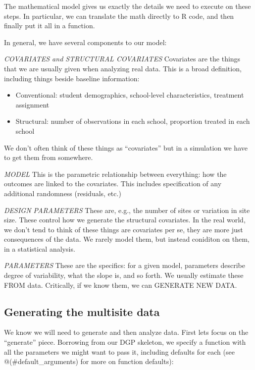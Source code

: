 \documentclass[
]{book}
\providecommand{\tightlist}{%
  \setlength{\itemsep}{0pt}\setlength{\parskip}{0pt}}
\begin{document}
The mathematical model gives us exactly the details we need to execute on these steps.
In particular, we can translate the math directly to R code, and then finally put it all in a function.

In general, we have several components to our model:

\emph{COVARIATES and STRUCTURAL COVARIATES}
Covariates are the things that we are usually given when analyzing real data.
This is a broad definition, including things beside baseline information:

\begin{itemize}
\tightlist
\item
  Conventional: student demographics, school-level characteristics, treatment assignment
\item
  Structural: number of observations in each school, proportion treated in each school
\end{itemize}

We don't often think of these things as ``covariates'' but in a simulation we have to get them from somewhere.

\emph{MODEL}
This is the parametric relationship between everything: how the outcomes are linked to the covariates.
This includes specification of any additional randomness (residuals, etc.)

\emph{DESIGN PARAMETERS}
These are, e.g., the number of sites or variation in site size.
These control how we generate the structural covariates.
In the real world, we don't tend to think of these things are covariates per se, they are more just consequences of the data.
We rarely model them, but instead coniditon on them, in a statistical analysis.

\emph{PARAMETERS}
These are the specifics: for a given model, parameters describe degree of variability, what the slope is, and so forth.
We usually estimate these FROM data.
Critically, if we know them, we can GENERATE NEW DATA.

\hypertarget{generating-the-multisite-data}{%
\subsection{Generating the multisite data}\label{generating-the-multisite-data}}

We know we will need to generate and then analyze data.
First lets focus on the ``generate'' piece.
Borrowing from our DGP skeleton, we specify a function with all the parameters we might want to pass it, including defaults for each (see @(\#default\_arguments) for more on function defaults):
\end{document}
